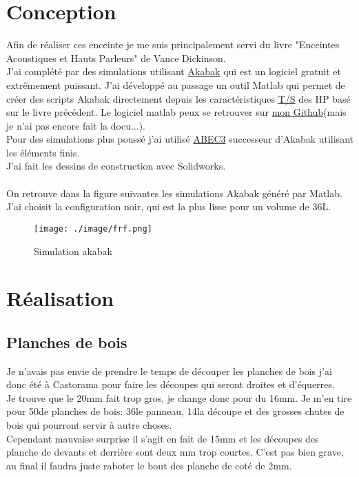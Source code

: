 \documentclass[a4paper,english]{report}
\begin{document}
			\chapter{Conception}
			Afin de réaliser ces enceinte je me suis principalement servi du livre "Enceintes Acoustiques et Hauts Parleurs" de Vance Dickinson.\\
			 J'ai complété par des simulations utilisant \href{http://www.randteam.de/AkAbak/Index.html}{Akabak} qui est un logiciel gratuit et extrêmement puissant. J'ai développé au passage un outil Matlab qui permet de créer des scripts Akabak directement depuis les caractéristiques \href{http://www.toutlehautparleur.com/parametres-thiele-and-small}{T/S} des HP basé sur le livre précédent. Le logiciel matlab peux se retrouver sur \href{https://github.com/Nuopel/EnclosureCalculator}{mon Github}(mais je n'ai pas encore fait la docu...). \\
			 Pour des simulations plus poussé j'ai utilisé \href{http://www.randteam.de/ABEC3/Index.html}{ABEC3} successeur d'Akabak utilisant les éléments finis.\\
			 J'ai fait les dessins de construction avec Solidworks.\\ \\
			 
			 On retrouve dans la figure suivantes les simulations Akabak généré par Matlab.
			 J'ai choisit la configuration noir, qui est la plus lisse pour un volume de 36L.			 
			 				\begin{figure}[H]
			 					\centering
			 					\texttt{[image: ./image/frf.png]}
			 					\label{Planche}
			 					\caption{Simulation akabak}
			 				\end{figure}
			 
			 
			\chapter{Réalisation}
			\section{Planches de bois}
			Je n'avais pas envie de prendre le temps de découper les planches de bois j'ai donc été à Castorama pour faire les découpes qui seront droites et d'équerres.\\
			Je trouve que le 20mm fait trop gros, je change donc pour du 16mm.
			Je m'en tire pour 50\texteuro de planches de bois: 36\texteuro le panneau, 14\texteuro la découpe et des grosses chutes de bois qui pourront servir à autre choses.\\
			Cependant mauvaise surprise il s'agit en fait de 15mm et les découpes des planche de devants et derrière sont deux mm trop courtes. C'est pas bien grave, au final il faudra juste raboter le bout des planche de coté de 2mm.
			
\end{document}
